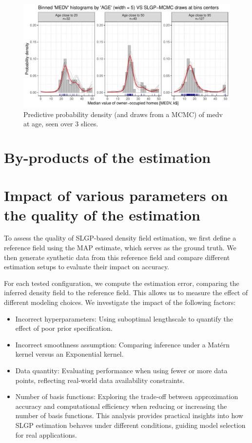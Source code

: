 \documentclass[
]{article}
\providecommand{\tightlist}{%
  \setlength{\itemsep}{0pt}\setlength{\parskip}{0pt}}
\begin{document}
\begin{figure}[H]

{\centering \includegraphics{IntroductionSLGP_files/figure-latex/SLGPMCMCplot-1} 

}

\caption{Predictive probability density (and draws from a MCMC) of medv at age, seen over 3 slices.}\label{fig:SLGPMCMCplot}
\end{figure}

\section{By-products of the estimation}\label{by-products-of-the-estimation}

\section{Impact of various parameters on the quality of the estimation}\label{impact-of-various-parameters-on-the-quality-of-the-estimation}

To assess the quality of SLGP-based density field estimation, we first define a reference field using the MAP estimate, which serves as the ground truth. We then generate synthetic data from this reference field and compare different estimation setups to evaluate their impact on accuracy.

For each tested configuration, we compute the estimation error, comparing the inferred density field to the reference field. This allows us to measure the effect of different modeling choices. We investigate the impact of the following factors:

\begin{itemize}
\tightlist
\item
  Incorrect hyperparameters: Using suboptimal lengthscale to quantify the effect of poor prior specification.
\item
  Incorrect smoothness assumption: Comparing inference under a Matérn kernel versus an Exponential kernel.
\item
  Data quantity: Evaluating performance when using fewer or more data points, reflecting real-world data availability constraints.
\item
  Number of basis functions: Exploring the trade-off between approximation accuracy and computational efficiency when reducing or increasing the number of basis functions.
  This analysis provides practical insights into how SLGP estimation behaves under different conditions, guiding model selection for real applications.
\end{itemize}
\end{document}
